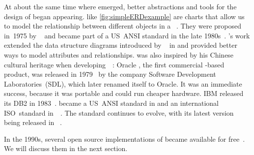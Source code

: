 At about the same time where  emerged, better abstractions and tools for the design of  began appearing.
 like \cref{fig:simpleERDexample} are charts that allow us to model the relationship between different objects in a \db~\cite{KW2012ASHOTEDAIM,C1976TERMTAUVOD}.
They were proposed in~1975 by \citeauthor{C1975TRMTAUVOD}~\cite{C1975TRMTAUVOD} and became part of a US~ANSI standard in the late 1980s~\cite{GK1985ATOOTIRDS,P1992IAX1ASFIRDSI}.
's work extended the data structure diagrams introduced by \citeauthor{B1969DSD}~\cite{B1969DSD} in \citeyear{B1969DSD} and provided better ways to model attributes and relationships.
 was also inspired by his Chinese cultural heritage when developing~~\cite{C1997ECAED,C2002ERMHEFTALL}:%
%
%
%
Oracle , the first commercial -based product, was released in 1979~\cite{C20245YOQ} by the company Software Development Laboratories~(SDL), which later renamed itself to Oracle.
It was an immediate success, because it was portable and could run cheaper hardware.
IBM released its   DB2 in 1983~\cite{C20245YOQ,HS2013THAGOID}.
 became a US~ANSI standard in \citeyear{ANSIX3135} and an international ISO~standard in~\citeyear{ISO90751987}~\cite{ANSIX3135,ISO90751987}.
The standard continues to evolve, with its latest version being released in \citeyear{ISOIEC9707112023E}~\cite{ISOIEC9707112023E}.

In the 1990s, several open source implementations of  became available for free~\cite{C20245YOQ}.
We will discuss them in the next section.%
%
\endhsection%
%
